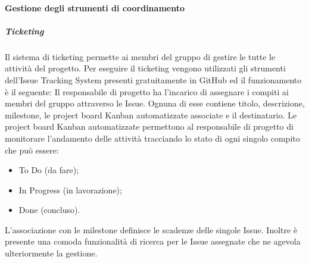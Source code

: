 			\paragraph{Gestione degli strumenti di coordinamento}
				\subparagraph*{Ticketing}
					Il sistema di ticketing permette ai membri del gruppo di gestire le tutte le attività del progetto.
					Per eseguire il ticketing vengono utilizzati gli strumenti dell'Issue Tracking System presenti gratuitamente in GitHub ed il funzionamento è il seguente:
					Il responsabile di progetto ha l'incarico di assegnare i compiti ai membri del gruppo attraverso le Issue. Ognuna di esse contiene titolo, descrizione,  milestone, le project board Kanban automatizzate associate e il destinatario.
					Le project board Kanban automatizzate permettono al responsabile di progetto di monitorare l'andamento delle attività tracciando lo stato di ogni singolo compito che può essere:
					\begin{itemize}
						\item To Do (da fare);
						\item In Progress (in lavorazione);
						\item Done (concluso).
					\end{itemize}
					L'associazione con le milestone definisce le scadenze delle singole Issue.
					Inoltre è presente una comoda funzionalità di ricerca per le Issue assegnate che ne agevola ulteriormente la gestione.
